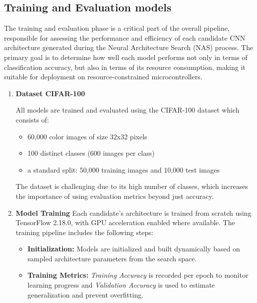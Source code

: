 \subsection{Training and Evaluation models}

The training and evaluation phase is a critical part of the overall pipeline, responsible for assessing the performance and efficiency of each candidate CNN architecture generated during the Neural Architecture Search (NAS) process. The primary goal is to determine how well each model performs not only in terms of classification accuracy, but also in terms of its resource consumption, making it suitable for deployment on resource-constrained microcontrollers.

\begin{enumerate}

    \item \textbf{Dataset CIFAR-100}
    
    All models are trained and evaluated using the CIFAR-100 dataset which consists of:
\begin{itemize}
    \item 60,000 color images of size 32x32 pixels
    \item 100 distinct classes (600 images per class)
\item a standard split: 50,000 training images and 10,000 test images

\end{itemize}

The dataset is challenging due to its high number of classes, which increases the importance of using evaluation metrics beyond just accuracy.

    \item \textbf{Model Training}
    Each candidate's architecture is trained from scratch using TensorFlow 2.18.0, with GPU acceleration enabled where available. The training pipeline includes the following steps:
    
\begin{itemize}
    \item \textbf{Initialization:} Models are initialized and built dynamically based on sampled architecture parameters from the search space.
    \item \textbf{Training Metrics:} \textit{Training Accuracy} is recorded per epoch to monitor learning progress and \textit{Validation Accuracy} is used to estimate generalization and prevent overfitting.

\end{itemize}


\end{enumerate}
